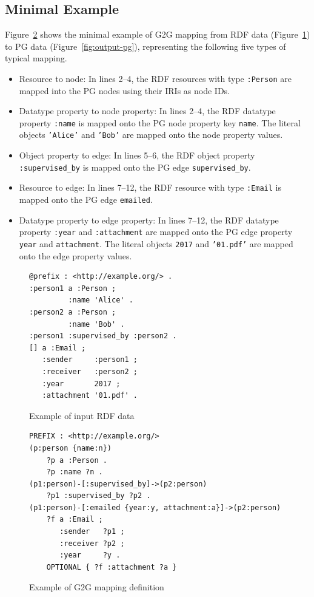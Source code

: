 \documentclass[runningheads]{llncs}
\begin{document}
\subsection{Minimal Example}
\label{subsec:minimal-examples}
Figure~\ref{fig:example-g2g} shows the minimal example of G2G mapping from RDF data (Figure~\ref{fig:example-rdf}) to PG data (Figure~\ref{fig:output-pg}), representing the following five types of typical mapping.

\begin{itemize}
    \item Resource to node: In lines 2--4, the RDF resources with type \texttt{:Person} are mapped into the PG nodes using their IRIs as node IDs.
    \item Datatype property to node property: In lines 2--4, the RDF datatype property \texttt{:name} is mapped onto the PG node property key \texttt{name}. The literal objects \texttt{'Alice'} and \texttt{'Bob'} are mapped onto the node property values.
    \item Object property to edge: In lines 5--6, the RDF object property \texttt{:supervised\_by} is mapped onto the PG edge \texttt{supervised\_by}.
    \item Resource to edge: In lines 7--12, the RDF resource with type \texttt{:Email} is mapped onto the PG edge \texttt{emailed}. 
    \item Datatype property to edge property: In lines 7--12, the RDF datatype property \texttt{:year} and \texttt{:attachment} are mapped onto the PG edge property \texttt{year} and \texttt{attachment}. The literal objects \texttt{2017} and \texttt{'01.pdf'} are mapped onto the edge property values.
\end{itemize}


\begin{figure}[!t]
\begin{scriptsize}
\begin{verbatim}
@prefix : <http://example.org/> .
:person1 a :Person ;
         :name 'Alice' .
:person2 a :Person ;
         :name 'Bob' .
:person1 :supervised_by :person2 .
[] a :Email ;
   :sender     :person1 ;
   :receiver   :person2 ;
   :year       2017 ;
   :attachment '01.pdf' .
\end{verbatim}
\end{scriptsize}
\caption{Example of input RDF data}
\label{fig:example-rdf}
\end{figure}


\begin{figure}[!t]
\begin{scriptsize}
\begin{verbatim}
PREFIX : <http://example.org/>
(p:person {name:n})
    ?p a :Person .
    ?p :name ?n .
(p1:person)-[:supervised_by]->(p2:person)
    ?p1 :supervised_by ?p2 .
(p1:person)-[:emailed {year:y, attachment:a}]->(p2:person)
    ?f a :Email ;
       :sender   ?p1 ;
       :receiver ?p2 ;
       :year     ?y .
    OPTIONAL { ?f :attachment ?a }
\end{verbatim}
\end{scriptsize}
\caption{Example of G2G mapping definition}
\label{fig:example-g2g}
\end{figure}
\end{document}
